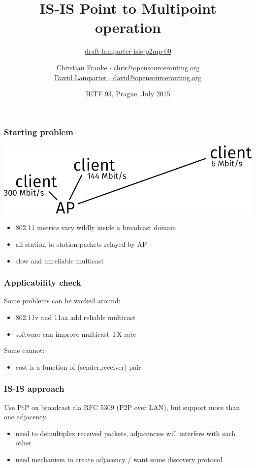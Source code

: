 \documentclass[12pt]{beamer}
\title{IS-IS Point to Multipoint operation}
\subtitle{%
  \href{https://datatracker.ietf.org/doc/draft-lamparter-isis-p2mp/}{draft-lamparter-isis-p2mp-00}
}
\author{%
\href{mailto:chris@opensourcerouting.org}{Christian Franke $\cdot$ chris@opensourcerouting.org}\\%
\underline{\href{mailto:david@opensourcerouting.org}{David Lamparter $\cdot$ david@opensourcerouting.org}}%
}
\date{IETF 93, Prague, July 2015}
\begin{document}
\begin{frame}
  \titlepage
\end{frame}

\begin{frame}
  \frametitle{Starting problem}
  \includegraphics[scale=0.65,angle=0]{isis_93_wifitopo.pdf}%
  \vspace{5mm}
  \begin{itemize}
    \item 802.11 metrics vary wildly inside a broadcast domain
    \item all station to station packets relayed by AP
    \item slow and unreliable multicast
  \end{itemize}
\end{frame}

\begin{frame}
  \frametitle{Applicability check}
  Some problems can be worked around:
  \begin{itemize}
    \item 802.11v and 11aa add reliable multicast
    \item software can improve multicast TX rate
  \end{itemize}
  Some cannot:
  \begin{itemize}
    \item cost is a function of (sender,receiver) pair
  \end{itemize}
\end{frame}

\begin{frame}
  \frametitle{IS-IS approach}

  Use PtP on broadcast ala RFC 5309 (P2P over LAN), but support more than one adjacency.

  \vspace{5mm}

  \begin{itemize}
    \item need to demultiplex received packets, adjacencies will interfere with each other
    \item need mechanism to create adjacency / want some discovery protocol
  \end{itemize}
\end{frame}
\end{document}
